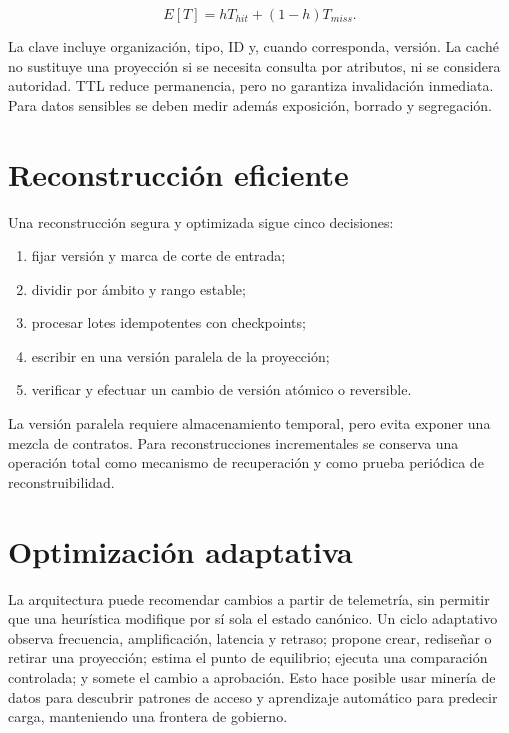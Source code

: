 \begin{equation}
E[T]=hT_{hit}+(1-h)T_{miss}.
\end{equation}

La clave incluye organización, tipo, ID y, cuando corresponda, versión. La caché no sustituye
una proyección si se necesita consulta por atributos, ni se considera autoridad. TTL
reduce permanencia, pero no garantiza invalidación inmediata. Para datos sensibles se
deben medir además exposición, borrado y segregación.

\section{Reconstrucción eficiente}

Una reconstrucción segura y optimizada sigue cinco decisiones:

\begin{enumerate}[leftmargin=*]
  \item fijar versión y marca de corte de entrada;
  \item dividir por ámbito y rango estable;
  \item procesar lotes idempotentes con checkpoints;
  \item escribir en una versión paralela de la proyección;
  \item verificar y efectuar un cambio de versión atómico o reversible.
\end{enumerate}

La versión paralela requiere almacenamiento temporal, pero evita exponer una mezcla de
contratos. Para reconstrucciones incrementales se conserva una operación total como
mecanismo de recuperación y como prueba periódica de reconstruibilidad.

\section{Optimización adaptativa}

La arquitectura puede recomendar cambios a partir de telemetría, sin permitir que una
heurística modifique por sí sola el estado canónico. Un ciclo adaptativo observa
frecuencia, amplificación, latencia y retraso; propone crear, rediseñar o retirar una
proyección; estima el punto de equilibrio; ejecuta una comparación controlada; y somete
el cambio a aprobación. Esto hace posible usar minería de datos para descubrir patrones
de acceso y aprendizaje automático para predecir carga, manteniendo una frontera de
gobierno.

